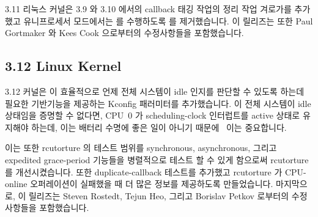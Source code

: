 3.11 리눅스 커널은 3.9 와 3.10 에서의 callback 태깅 작업의 정리 작업 겨로가를
추가했고 유니프로세서 모드에서는  를 수행하도록
 를 제거했습니다.
이 릴리즈는 또한 Paul Gortmaker 와 Kees Cook 으로부터의 수정사항들을
포함했습니다.

\subsection{3.12 Linux Kernel}

3.12 커널은  이 효율적으로 언제 전체 시스템이 idle 인지를
판단할 수 있도록 하는데 필요한 기반기능을 제공하는
 Kconfig 패러미터를 추가했습니다.
 이 전체 시스템이 idle 상태임을 증명할 수 없다면, CPU~0
가 scheduling-clock 인터럽트를 active 상태로 유지해야 하는데, 이는 배터리
수명에 좋은 일이 아니기 때문에~\cite{JonathanCorbet2013SYSIDLE} 이는
중요합니다.

이는 또한 rcutorture 의 테스트 범위를 synchronous, asynchronous, 그리고
expedited grace-period 기능들을 병렬적으로 테스트 할 수 있게 함으로써
rcutorture 를 개선시켰습니다.
또한 duplicate-callback 테스트를 추가했고 rcutorture 가 CPU-online 오퍼레이션이
실패했을 때 더 많은 정보를 제공하도록 만들었습니다.
마지막으로, 이 릴리즈는 Steven Rostedt, Tejun Heo, 그리고 Borislav Petkov
로부터의 수정사항들을 포함했습니다.

